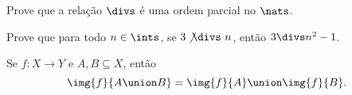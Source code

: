 \begin{exercise}
    Prove que a relação $\divs$ é uma ordem parcial no $\nats$.
\end{exercise}

\begin{exercise}
    Prove que para todo $n \in \ints$, se $3\not{\divs} \ n$, então $3 \divs n^2 - 1$.
\end{exercise}

\begin{exercise}
    Se $f : X \to Y$ e $A, B \subseteq X$, então 
    $$
    \img {f} {A \union B} = \img {f} {A} \union \img {f} {B}.
    $$
\end{exercise}
